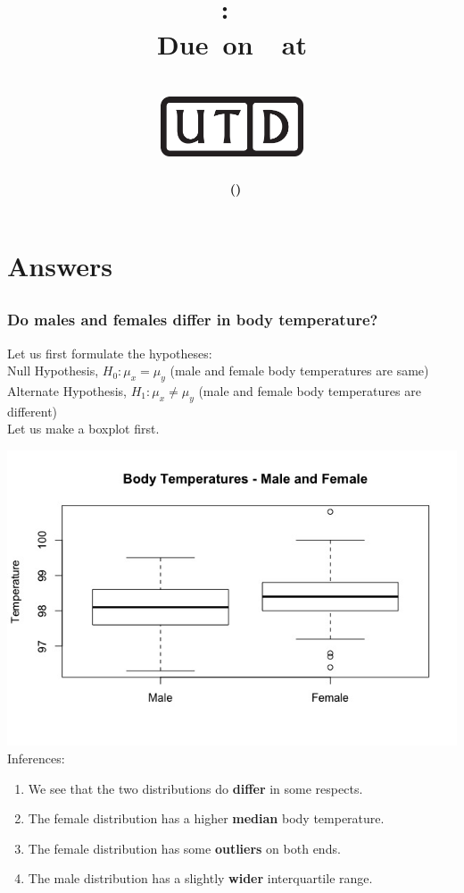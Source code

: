 \documentclass[12pt,letterpaper,titlepage,en-US]{article}
\title{
    \vspace{1in}
    \textmd{\textbf{\hmwkClassName \\\hmwkClass:\ \hmwkTitle }}\\
     \normalsize\vspace{0.1in}\small{Due\ on\ \DTMusedate{DueDate}\ at \DTMusetime{DueDate} }\\
    \vspace{0.1in}\large{\textit{\hmwkClassInstructor}}\\
    \vspace{0.5in}\includegraphics[height=2.4em]{UTD_logo_BW}\\
    \vspace{2in}
}
\author{\textbf{\hmwkAuthorName\ \footnotesize{(\hmwkAuthorNetID)}} \\ }
\date{}
\begin{document}
\maketitle


\tableofcontents

\pagebreak
{}


\section{Answers}

\subsection{}

\subsubsection{Do males and females differ in body temperature?}
Let us first formulate the hypotheses:\\
Null Hypothesis, $H_{0}: \mu_{x}=\mu_{y}$ (male and female body temperatures are same)\\
\indent Alternate Hypothesis, $H_{1}: \mu_{x} \neq \mu_{y}$ (male and female body temperatures are different)
\\

 Let us make a boxplot first.


\includegraphics[scale=0.6]{body-temp.jpeg}\\


Inferences:
\begin{enumerate}
\item We see that the two distributions do \textbf{differ} in some respects. 
\item The female distribution has a higher \textbf{median} body temperature.
\item The female distribution has some \textbf{outliers} on both ends.
\item The male distribution has a slightly \textbf{wider} interquartile range.
\end{enumerate}
\end{document}

